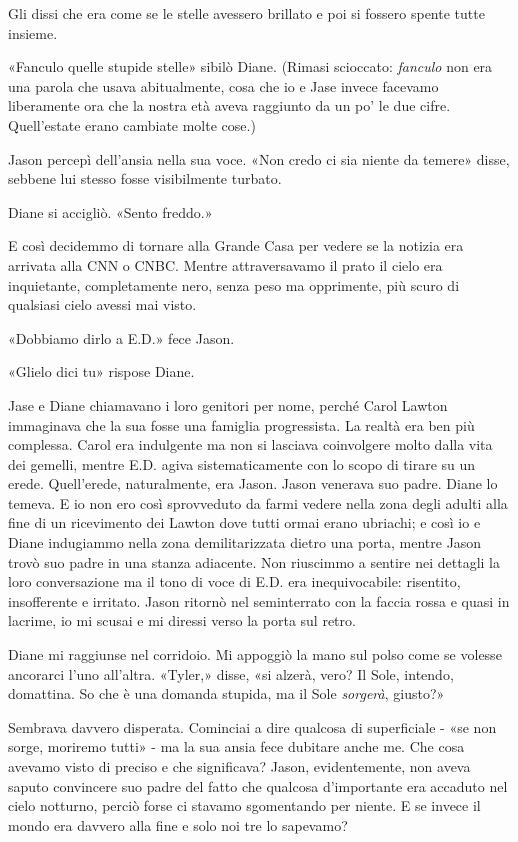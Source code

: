 Gli dissi che era come se le stelle avessero brillato e poi si fossero
spente tutte insieme.

«Fanculo quelle stupide stelle» sibilò Diane. (Rimasi scioccato:
\emph{fanculo} non era una parola che usava abitualmente, cosa che io e
Jase invece facevamo liberamente ora che la nostra età aveva raggiunto
da un po' le due cifre. Quell'estate erano cambiate molte cose.)

Jason percepì dell'ansia nella sua voce. «Non credo ci sia niente da
temere» disse, sebbene lui stesso fosse visibilmente turbato.

Diane si accigliò. «Sento freddo.»

E così decidemmo di tornare alla Grande Casa per vedere se la notizia
era arrivata alla CNN o CNBC. Mentre attraversavamo il prato il cielo
era inquietante, completamente nero, senza peso ma opprimente, più scuro
di qualsiasi cielo avessi mai visto.

\separatorefiori

«Dobbiamo dirlo a E.D.» fece Jason.

«Glielo dici tu» rispose Diane.

Jase e Diane chiamavano i loro genitori per nome, perché Carol Lawton
immaginava che la sua fosse una famiglia progressista. La realtà era ben
più complessa. Carol era indulgente ma non si lasciava coinvolgere molto
dalla vita dei gemelli, mentre E.D. agiva sistematicamente con lo scopo
di tirare su un erede. Quell'erede, naturalmente, era Jason. Jason
venerava suo padre. Diane lo temeva. E io non ero così sprovveduto da
farmi vedere nella zona degli adulti alla fine di un ricevimento dei
Lawton dove tutti ormai erano ubriachi; e così io e Diane indugiammo
nella zona demilitarizzata dietro una porta, mentre Jason trovò suo
padre in una stanza adiacente. Non riuscimmo a sentire nei dettagli la
loro conversazione ma il tono di voce di E.D. era inequivocabile:
risentito, insofferente e irritato. Jason ritornò nel seminterrato con
la faccia rossa e quasi in lacrime, io mi scusai e mi diressi verso la
porta sul retro.

Diane mi raggiunse nel corridoio. Mi appoggiò la mano sul polso come se
volesse ancorarci l'uno all'altra. «Tyler,» disse, «si alzerà, vero? Il
Sole, intendo, domattina. So che è una domanda stupida, ma il Sole
\emph{sorgerà}, giusto?»

Sembrava davvero disperata. Cominciai a dire qualcosa di superficiale -
«se non sorge, moriremo tutti» - ma la sua ansia fece dubitare anche me.
Che cosa avevamo visto di preciso e che significava? Jason,
evidentemente, non aveva saputo convincere suo padre del fatto che
qualcosa d'importante era accaduto nel cielo notturno, perciò forse ci
stavamo sgomentando per niente. E se invece il mondo era davvero alla
fine e solo noi tre lo sapevamo?

